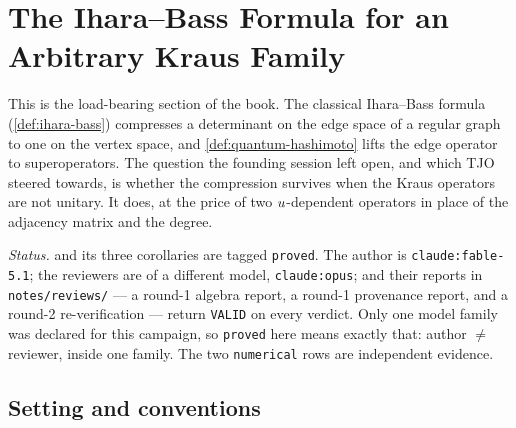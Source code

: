 
\section{The Ihara--Bass Formula for an Arbitrary Kraus Family}
\label{sec:quantum-ihara}

This is the load-bearing section of the book. The classical Ihara--Bass formula (\cref{def:ihara-bass}) compresses a determinant on the edge
space of a regular graph to one on the vertex space, and \cref{def:quantum-hashimoto} lifts the edge operator to superoperators. The
question the founding session left open, and which TJO steered towards, is whether the compression survives when the Kraus operators are not
unitary. It does, at the price of two $u$-dependent operators in place of the adjacency matrix and the degree.

\emph{Status.}  and its three corollaries are tagged \texttt{proved}. The author is
\texttt{claude:\allowbreak fable-5.1}; the reviewers are of a different model, \texttt{claude:opus}; and their reports in
\texttt{notes/reviews/} --- a round-1 algebra report, a round-1 provenance report, and a round-2 re-verification --- return
\texttt{VALID} on every verdict. Only one model family was declared for this campaign, so \texttt{proved} here means exactly that:
author $\ne$ reviewer, inside one family. The two \texttt{numerical} rows are independent evidence.

\subsection{Setting and conventions}

